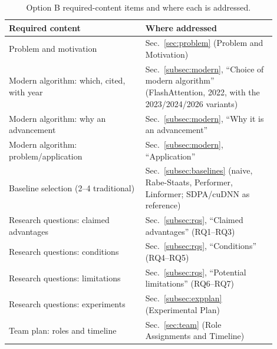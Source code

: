 \documentclass[sigconf,nonacm]{acmart}
\begin{document}
\begin{table}[h]
  \centering
  \caption{Option B required-content items and where each is addressed.}
  \label{tab:content}
  \small
  \begin{tabular}{@{}p{0.46\linewidth}p{0.44\linewidth}@{}}
    \toprule
    \textbf{Required content} & \textbf{Where addressed} \\
    \midrule
    Problem and motivation &
      Sec.~\ref{sec:problem} (Problem and Motivation) \\
    Modern algorithm: which, cited, with year &
      Sec.~\ref{subsec:modern}, ``Choice of modern algorithm'' (FlashAttention,
      2022, with the 2023/2024/2026 variants) \\
    Modern algorithm: why an advancement &
      Sec.~\ref{subsec:modern}, ``Why it is an advancement'' \\
    Modern algorithm: problem/application &
      Sec.~\ref{subsec:modern}, ``Application'' \\
    Baseline selection (2--4 traditional) &
      Sec.~\ref{subsec:baselines} (naive, Rabe-Staats, Performer, Linformer;
      SDPA/cuDNN as reference) \\
    Research questions: claimed advantages &
      Sec.~\ref{subsec:rqs}, ``Claimed advantages'' (RQ1--RQ3) \\
    Research questions: conditions &
      Sec.~\ref{subsec:rqs}, ``Conditions'' (RQ4--RQ5) \\
    Research questions: limitations &
      Sec.~\ref{subsec:rqs}, ``Potential limitations'' (RQ6--RQ7) \\
    Research questions: experiments &
      Sec.~\ref{subsec:expplan} (Experimental Plan) \\
    Team plan: roles and timeline &
      Sec.~\ref{sec:team} (Role Assignments and Timeline) \\
    \bottomrule
  \end{tabular}
\end{table}
\end{document}
